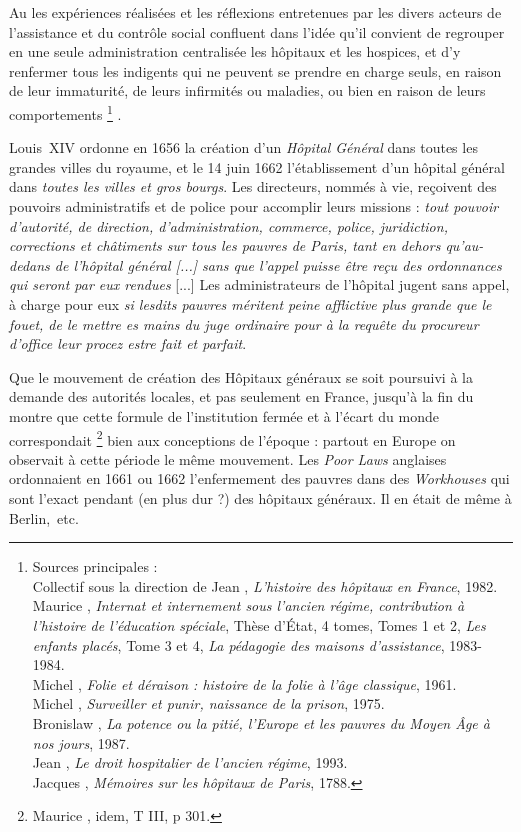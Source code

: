  Au  les expériences réalisées et les réflexions entretenues par les divers acteurs de l'assistance et du contrôle social confluent dans l'idée qu'il convient de regrouper en une seule administration centralisée les hôpitaux et les hospices, et d'y renfermer tous les indigents qui ne peuvent se prendre en charge seuls, en raison de leur immaturité, de leurs infirmités ou maladies, ou bien en raison de leurs comportements%
\footnote{Sources principales :
\\Collectif sous la direction de Jean , \emph{L'histoire des hôpitaux en France}, 1982.
\\Maurice {}, \emph{Internat et internement sous l'ancien régime, contribution à l'histoire de l'éducation spéciale}, Thèse d'État, 4 tomes, Tomes 1 et 2, \emph{Les enfants placés}, Tome 3 et 4, \emph{La pédagogie des maisons d'assistance}, 1983-1984.
\\Michel {}, \emph{Folie et déraison : histoire de la folie à l'âge classique}, 1961.
\\Michel {}, \emph{Surveiller et punir, naissance de la prison}, 1975.
\\Bronislaw {}, \emph{La potence ou la pitié, l'Europe et les pauvres du Moyen Âge à nos jours}, 1987.
\\Jean {}, \emph{Le droit hospitalier de l'ancien régime}, 1993.
\\Jacques {}, \emph{Mémoires sur les hôpitaux de Paris}, 1788.}%
. 

 Louis~XIV ordonne en 1656 la création d'un \emph{Hôpital Général} dans toutes les grandes villes du royaume, et le 14 juin 1662 l'établissement d'un hôpital général dans \emph{toutes les villes et gros bourgs}. Les directeurs, nommés à vie, reçoivent des pouvoirs administratifs et de police pour accomplir leurs missions : \emph{tout pouvoir d'autorité, de direction, d'administration, commerce, police, juridiction, corrections et châtiments sur tous les pauvres de Paris, tant en dehors qu'au-dedans de l'hôpital général \emph{[...]} sans que l'appel puisse être reçu des ordonnances qui seront par eux rendues} [...] Les administrateurs de l'hôpital jugent sans appel, à charge pour eux \emph{si lesdits pauvres méritent peine afflictive plus grande que le fouet, de le mettre es mains du juge ordinaire pour à la requête du procureur d'office leur procez estre fait et parfait}. 

 Que le mouvement de création des Hôpitaux généraux se soit poursuivi à la demande des autorités locales, et pas seulement en France, jusqu'à la fin du  montre que cette formule de l'institution fermée et à l'écart du monde correspondait%
\footnote{Maurice , idem, T III, p 301.} 
bien aux conceptions de l'époque : partout en Europe on observait à cette période le même mouvement. Les \emph{Poor Laws} anglaises ordonnaient en 1661 ou 1662 l'enfermement des pauvres dans des \emph{Workhouses} qui sont l'exact pendant (en plus dur ?) des hôpitaux généraux. Il en était de même à Berlin,~etc.

